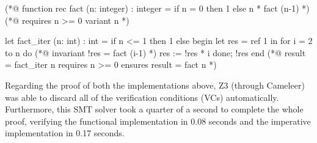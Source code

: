 \bigskip
\newcommand{\provername}[1]{\cellcolor{yellow!25}
\begin{sideways}\textbf{#1}~~\end{sideways}}
\newcommand{\explanation}[1]{\cellcolor{yellow!13}lemma \texttt{#1}}
\newcommand{\transformation}[1]{\cellcolor{yellow!13}transformation \texttt{#1}}
\newcommand{\subgoal}[2]{\cellcolor{yellow!13}subgoal #2}
\newcommand{\valid}[1]{\cellcolor{green!13}#1}
\newcommand{\unknown}[1]{\cellcolor{red!20}#1}
\newcommand{\invalid}[1]{\cellcolor{red!50}#1}
\newcommand{\timeout}[1]{\cellcolor{red!20}(#1)}
\newcommand{\outofmemory}[1]{\cellcolor{red!20}(#1)}
\newcommand{\noresult}{\multicolumn{1}{>{\columncolor[gray]{0.8}}c|}{~}}
\newcommand{\highfailure}{\cellcolor{red!50}FAILURE}
    
\begin{minipage}{\linewidth}
\begin{gospel}
  (*@ function rec fact (n: integer) : integer =
  if n = 0 then 1 else n * fact (n-1) *)
  (*@ requires n >= 0 
    variant n *)
\end{gospel}
\end{minipage}

\begin{minipage}{\linewidth}
\begin{ocamlenv}
  let fact_iter (n: int) : int =
    if n <= 1 then 1
    else
      begin 
        let res = ref 1 in
        for i = 2 to n do
          (*@ invariant !res = fact (i-1) *)
          res := !res * i
        done;
        !res
      end
  (*@ result = fact_iter n
    requires n >= 0 
    ensures result = fact n *)
\end{ocamlenv}
\end{minipage}

Regarding the proof of both the implementations above, Z3 (through Cameleer) was able to discard all of the verification conditions (VCs) automatically.
Furthermore, this SMT solver took a quarter of a second to complete the whole proof, verifying the functional implementation in 0.08 seconds and the imperative implementation in 0.17 seconds.

